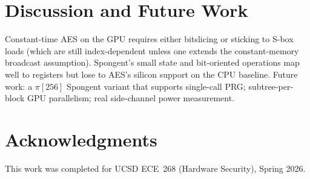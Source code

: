\documentclass[10pt,conference]{IEEEtran}
\begin{document}
\section{Discussion and Future Work}
Constant-time AES on the GPU requires either bitslicing or sticking to
S-box loads (which are still index-dependent unless one extends the
constant-memory broadcast assumption). Spongent's small state and bit-oriented
operations map well to registers but lose to AES's silicon support on the
CPU baseline. Future work: a $\pi[256]$ Spongent variant that supports
single-call PRG; subtree-per-block GPU parallelism; real side-channel power
measurement.

\section*{Acknowledgments}
This work was completed for UCSD ECE~268 (Hardware Security), Spring 2026.



\end{document}
